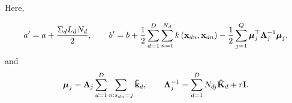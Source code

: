 	Here,
	
	\begin{align}
	a'=a+{\frac{\Sigma_d L_d N_d}{2}}, \quad \quad b'=b+{\frac{1}{2}}\sum\limits_{d=1}^{D}\sum\limits_{n=1}^{N_d}k\left(\mathbf{x}_{dn},\mathbf{x}_{dn}\right)-{\frac{1}{2}}\sum\limits_{j=1}^{Q}\boldsymbol{\mu}_j^\top \boldsymbol{\Lambda}_j^{-1}\boldsymbol{\mu}_j,
	\end{align}
	and 
	\begin{align}
	\boldsymbol{\mu}_j =\boldsymbol{\Lambda}_j\sum\limits_{d=1}^{D}{\sum\limits_{n:s_{dn}=j}\mathbf{\hat{k}}_d}, \quad \quad \boldsymbol{\Lambda}_j^{-1} =\sum\limits_{d=1}^{D}{N_{dj}\mathbf{\hat{K}}_d+r\mathbf{I}}.
	\end{align}
	
	
	
